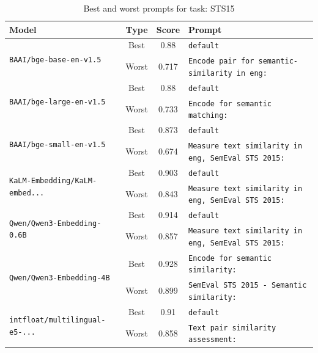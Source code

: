 \begin{table}[t]
\centering
\small
\caption{Best and worst prompts for task: STS15}
\begin{tabular}{|p{}|c|c|p{}|}
\hline
Model & Type & Score & Prompt \\
\hline
\multirow{2}{=}{\raggedright\texttt{BAAI/\allowbreak bge-\allowbreak base-\allowbreak en-\allowbreak v1.5}} & Best & 0.88 & \texttt{default} \\
\cline{2-4}
& Worst & 0.717 & \texttt{Encode pair for semantic-similarity in eng:} \\
\hline
\multirow{2}{=}{\raggedright\texttt{BAAI/\allowbreak bge-\allowbreak large-\allowbreak en-\allowbreak v1.5}} & Best & 0.88 & \texttt{default} \\
\cline{2-4}
& Worst & 0.733 & \texttt{Encode for semantic matching:} \\
\hline
\multirow{2}{=}{\raggedright\texttt{BAAI/\allowbreak bge-\allowbreak small-\allowbreak en-\allowbreak v1.5}} & Best & 0.873 & \texttt{default} \\
\cline{2-4}
& Worst & 0.674 & \texttt{Measure text similarity in eng, SemEval STS 2015:} \\
\hline
\multirow{2}{=}{\raggedright\texttt{KaLM-\allowbreak Embedding/\allowbreak KaLM-\allowbreak embed...}} & Best & 0.903 & \texttt{default} \\
\cline{2-4}
& Worst & 0.843 & \texttt{Measure text similarity in eng, SemEval STS 2015:} \\
\hline
\multirow{2}{=}{\raggedright\texttt{Qwen/\allowbreak Qwen3-\allowbreak Embedding-\allowbreak 0.6B}} & Best & 0.914 & \texttt{default} \\
\cline{2-4}
& Worst & 0.857 & \texttt{Measure text similarity in eng, SemEval STS 2015:} \\
\hline
\multirow{2}{=}{\raggedright\texttt{Qwen/\allowbreak Qwen3-\allowbreak Embedding-\allowbreak 4B}} & Best & 0.928 & \texttt{Encode for semantic similarity:} \\
\cline{2-4}
& Worst & 0.899 & \texttt{SemEval STS 2015 - Semantic similarity:} \\
\hline
\multirow{2}{=}{\raggedright\texttt{intfloat/\allowbreak multilingual-\allowbreak e5-\allowbreak ...}} & Best & 0.91 & \texttt{default} \\
\cline{2-4}
& Worst & 0.858 & \texttt{Text pair similarity assessment:} \\
\hline
\end{tabular}
\end{table}

